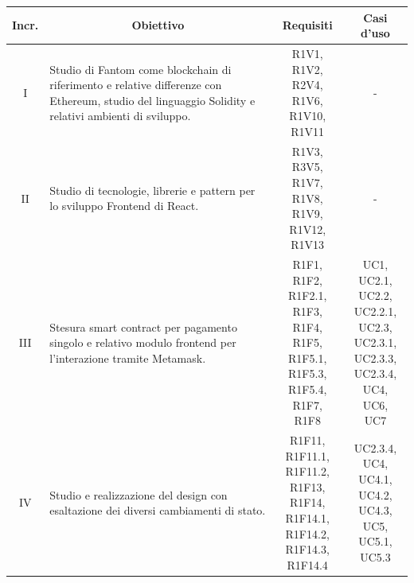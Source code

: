 \begin{table}[H]
  \centering
  \renewcommand{\arraystretch}{1.8}
  \begin{tabular}{c|p{6cm}|c|c}
    \rowcolor[HTML]{125E28}
    \color[HTML]{FFFFFF}\textbf{Incr.}
    & \multicolumn{1}{c}{\color[HTML]{FFFFFF}\textbf{Obiettivo}}
    & \multicolumn{1}{c}{\color[HTML]{FFFFFF}\textbf{Requisiti}}
    & \multicolumn{1}{c}{\color[HTML]{FFFFFF}\textbf{Casi d'uso}}\\
    \hline
    I	& Studio di Fantom\glo{} come blockchain\glo{} di riferimento e relative differenze con Ethereum\glo{}, studio del linguaggio Solidity\glo{} e relativi ambienti di sviluppo.	& \Shortunderstack{R1V1, R1V2,\\R2V4, R1V6,\\R1V10, R1V11\\} & - \\
    II & Studio di tecnologie, librerie e pattern per lo sviluppo Frontend\glo{} di React. & \Shortunderstack{R1V3, R3V5,\\R1V7, R1V8,\\R1V9, R1V12,\\R1V13\\} & - \\
    III	& Stesura smart contract\glo{} per pagamento singolo e relativo modulo frontend\glo{} per l'interazione tramite Metamask\glo{}. & \Shortunderstack{R1F1, R1F2,\\R1F2.1, R1F3,\\R1F4, R1F5,\\R1F5.1, R1F5.3,\\R1F5.4, R1F7,\\R1F8\\} & \Shortunderstack{UC1, UC2.1,\\UC2.2, UC2.2.1,\\UC2.3, UC2.3.1,\\UC2.3.3, UC2.3.4,\\UC4, UC6,\\UC7\\}\\
    IV & Studio e realizzazione del design con esaltazione dei diversi cambiamenti di stato. & \Shortunderstack{R1F11, R1F11.1,\\R1F11.2, R1F13,\\R1F14, R1F14.1,\\R1F14.2, R1F14.3,\\R1F14.4\\} & \Shortunderstack{UC2.3.4, UC4,\\UC4.1, UC4.2,\\UC4.3, UC5,\\UC5.1, UC5.3\\}\\

\end{tabular}
\end{table}
